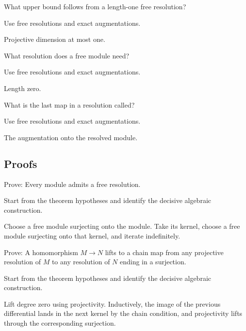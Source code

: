 \begin{exercise}\label{exr:v23-expand-03}
What upper bound follows from a length-one free resolution?
\end{exercise}
\begin{hint}
Use free resolutions and exact augmentations.
\end{hint}
\begin{solution}
Projective dimension at most one.
\end{solution}

\begin{exercise}\label{exr:v23-expand-04}
What resolution does a free module need?
\end{exercise}
\begin{hint}
Use free resolutions and exact augmentations.
\end{hint}
\begin{solution}
Length zero.
\end{solution}

\begin{exercise}[Augmentation]\label{exr:v23-expand-05}
What is the last map in a resolution called?
\end{exercise}
\begin{hint}
Use free resolutions and exact augmentations.
\end{hint}
\begin{solution}
The augmentation onto the resolved module.
\end{solution}

\subsection*{Proofs}

\begin{exercise}\label{exr:v23-expand-06}
Prove: Every module admits a free resolution.
\end{exercise}
\begin{hint}
Start from the theorem hypotheses and identify the decisive algebraic construction.
\end{hint}
\begin{solution}
Choose a free module surjecting onto the module. Take its kernel, choose a free module surjecting onto that kernel, and iterate indefinitely.
\end{solution}

\begin{exercise}\label{exr:v23-expand-07}
Prove: A homomorphism $M\to N$ lifts to a chain map from any projective resolution of $M$ to any resolution of $N$ ending in a surjection.
\end{exercise}
\begin{hint}
Start from the theorem hypotheses and identify the decisive algebraic construction.
\end{hint}
\begin{solution}
Lift degree zero using projectivity. Inductively, the image of the previous differential lands in the next kernel by the chain condition, and projectivity lifts through the corresponding surjection.
\end{solution}

